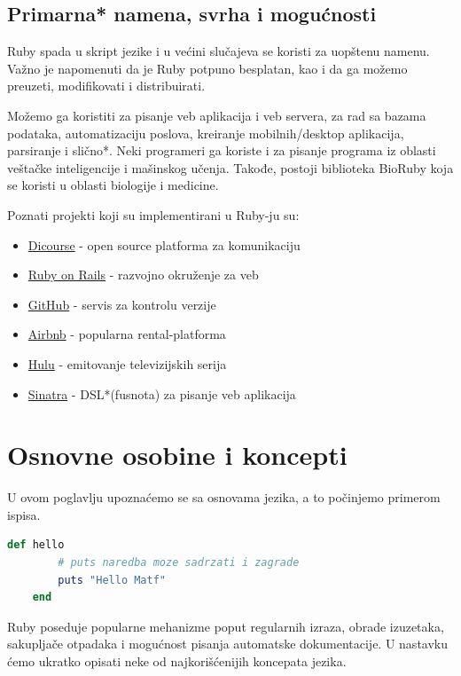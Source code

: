 \documentclass[a4paper]{article}
\begin{document}
\subsection{Primarna* namena, svrha i mogućnosti}
Ruby spada u skript jezike i u većini slučajeva se koristi za uopštenu namenu. Važno je napomenuti da je Ruby potpuno besplatan, kao i da ga možemo preuzeti, modifikovati i distribuirati.

Možemo ga koristiti za pisanje veb aplikacija i veb servera, za rad sa bazama podataka, automatizaciju poslova, kreiranje mobilnih/desktop aplikacija, parsiranje i slično*. Neki programeri ga koriste i za pisanje programa iz oblasti veštačke inteligencije i mašinskog učenja. Takođe, postoji biblioteka BioRuby koja se koristi u oblasti biologije i medicine.

Poznati projekti koji su implementirani u Ruby-ju su:
\begin{itemize}
	\item \href{https://www.discourse.org/}{Dicourse} - open source platforma za komunikaciju
	\item \href{https://rubyonrails.org/}{Ruby on Rails} - razvojno okruženje za veb
	\item \href{https://www.github.com/}{GitHub} - servis za kontrolu verzije
	\item \href{https://www.airbnb.com/}{Airbnb} - popularna rental-platforma
	\item \href{https://www.hulu.com/tv}{Hulu} - emitovanje televizijskih serija
	\item \href{http://sinatrarb.com/}{Sinatra} - DSL*(fusnota) za pisanje veb aplikacija
\end{itemize}

\section{Osnovne osobine i koncepti}
U ovom poglavlju upoznaćemo se sa osnovama jezika, a to počinjemo primerom ispisa.
\begin{lstlisting}[language=Ruby]
	def hello
		# puts naredba moze sadrzati i zagrade
		puts "Hello Matf"
	end
\end{lstlisting}\vspace*{-15pt}

Ruby poseduje popularne mehanizme poput regularnih izraza, obrade izuzetaka, sakupljače otpadaka i mogućnost pisanja automatske dokumentacije. U nastavku ćemo ukratko opisati neke od najkorišćenijih koncepata jezika.
\end{document}
